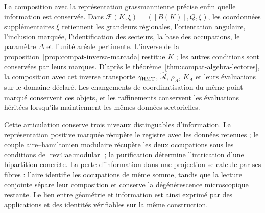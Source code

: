 La composition avec la représentation grassmannienne précise enfin quelle information est conservée. Dans \(\mathcal F(K,\xi)=([B(K)],Q,\xi)\), les coordonnées supplémentaires \(\xi\) retiennent les grandeurs régionales, l'orientation angulaire, l'inclusion marquée, l'identification des secteurs, la base des occupations, le paramètre \(\Delta\) et l'unité aréale pertinente. L'inverse de la proposition~\ref{prop:compat-inversa-marcada} restitue \(K\) ; les autres conditions sont conservées par leurs marques. D'après le théorème~\ref{thm:compat-algebra-lectores}, la composition avec cet inverse transporte \(\gamma_{\rm HMT}\), \(\widehat{\mathcal A}\), \(\rho_A\), \(K_A\) et leurs évaluations sur le domaine déclaré. Les changements de coordinatisation du même point marqué conservent ces objets, et les raffinements conservent les évaluations héritées lorsqu'ils maintiennent les mêmes données sectorielles.

Cette articulation conserve trois niveaux distinguables d’information.
La représentation positive marquée récupère le registre avec les données
retenues ; le couple aire--hamiltonien modulaire récupère les deux
occupations sous les conditions de \eqref{rev4:ae:modular} ; la
purification détermine l’intrication d’une bipartition concrète.
La perte d’information dans une projection se calcule par ses fibres :
l’aire identifie les occupations de même somme, tandis que la lecture
conjointe sépare leur composition et conserve la dégénérescence microscopique
restante. Le lien entre géométrie et information est ainsi exprimé
par des applications et des identités vérifiables sur la même construction.

